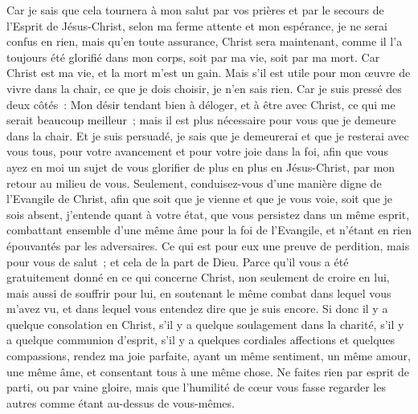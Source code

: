 \begin{multicols}{2}
Car je sais que cela tournera à mon salut par vos prières et par le secours de l'Esprit de Jésus-Christ,
selon ma ferme attente et mon espérance, je ne serai confus en rien, mais qu'en toute assurance, Christ sera maintenant, comme il l'a toujours été glorifié dans mon corps, soit par ma vie, soit par ma mort.
Car Christ est ma vie, et la mort m'est un gain.
Mais s'il est utile pour mon œuvre de vivre dans la chair, ce que je dois choisir, je n'en sais rien.
Car je suis pressé des deux côtés~: Mon désir tendant bien à déloger, et à être avec Christ, ce qui me serait beaucoup meilleur~;
mais il est plus nécessaire pour vous que je demeure dans la chair.
Et je suis persuadé, je sais que je demeurerai et que je resterai avec vous tous, pour votre avancement et pour votre joie dans la foi,
afin que vous ayez en moi un sujet de vous glorifier de plus en plus en Jésus-Christ, par mon retour au milieu de vous.
Seulement, conduisez-vous d'une manière digne de l'Evangile de Christ, afin que soit que je vienne et que je vous voie, soit que je sois absent, j'entende quant à votre état, que vous persistez dans un même esprit, combattant ensemble d'une même âme pour la foi de l'Evangile, et n'étant en rien épouvantés par les adversaires.
Ce qui est pour eux une preuve de perdition, mais pour vous de salut~; et cela de la part de Dieu.
Parce qu'il vous a été gratuitement donné en ce qui concerne Christ, non seulement de croire en lui, mais aussi de souffrir pour lui,
en soutenant le même combat dans lequel vous m'avez vu, et dans lequel vous entendez dire que je suis encore.
\VerseOne{}Si donc il y a quelque consolation en Christ, s'il y a quelque soulagement dans la charité, s'il y a quelque communion d'esprit, s'il y a quelques cordiales affections et quelques compassions,
rendez ma joie parfaite, ayant un même sentiment, un même amour, une même âme, et consentant tous à une même chose.
Ne faites rien par esprit de parti, ou par vaine gloire, mais que l'humilité de cœur vous fasse regarder les autres comme étant au-dessus de vous-mêmes.

\end{multicols}

